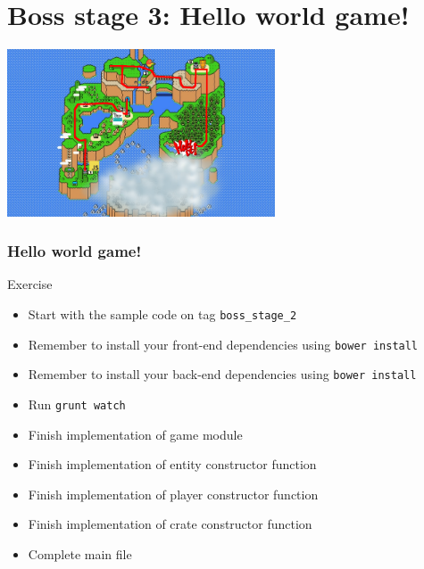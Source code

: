 \section{Boss stage 3: Hello world game!}

\begin{frame}[fragile]
  \begin{center}
    \includegraphics[width=300px]{images/map_boss_stage_3.png}
  \end{center}
\end{frame}

\begin{frame}[fragile]
  \frametitle{Hello world game!}

  \begin{block}{Exercise}
    \begin{itemize}
      \item Start with the sample code on tag \texttt{boss\_stage\_2}
      \item Remember to install your front-end dependencies using \texttt{bower install}
      \item Remember to install your back-end dependencies using \texttt{bower install}
      \item Run \texttt{grunt watch}
      \item Finish implementation of game module
      \item Finish implementation of entity constructor function
      \item Finish implementation of player constructor function
      \item Finish implementation of crate constructor function
      \item Complete main file
    \end{itemize}
  \end{block}
\end{frame}
